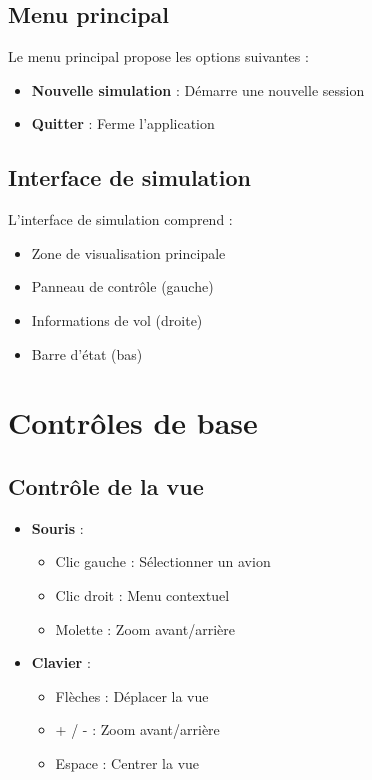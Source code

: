 \documentclass[12pt,a4paper]{article}
\begin{document}
\subsection{Menu principal}
Le menu principal propose les options suivantes :
\begin{itemize}
    \item \textbf{Nouvelle simulation} : Démarre une nouvelle session
    \item \textbf{Quitter} : Ferme l'application
\end{itemize}

\subsection{Interface de simulation}
L'interface de simulation comprend :
\begin{itemize}
    \item Zone de visualisation principale
    \item Panneau de contrôle (gauche)
    \item Informations de vol (droite)
    \item Barre d'état (bas)
\end{itemize}

\section{Contrôles de base}

\subsection{Contrôle de la vue}
\begin{itemize}
    \item \textbf{Souris} : 
    \begin{itemize}
        \item Clic gauche : Sélectionner un avion
        \item Clic droit : Menu contextuel
        \item Molette : Zoom avant/arrière
    \end{itemize}
    \item \textbf{Clavier} :
    \begin{itemize}
        \item Flèches : Déplacer la vue
        \item + / - : Zoom avant/arrière
        \item Espace : Centrer la vue
    \end{itemize}
\end{itemize}
\end{document}
